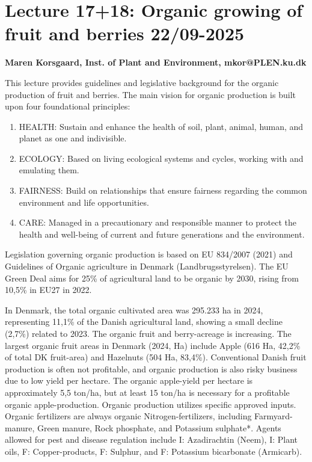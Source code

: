 \section{Lecture 17+18: Organic growing of fruit and
berries 22/09-2025}
\textbf{Maren Korsgaard, Inst. of Plant and Environment, mkor@PLEN.ku.dk}

\vspace{1em}
This lecture provides guidelines and legislative background for the organic production of fruit and berries. The main vision for organic production is built upon four foundational principles: 

\begin{enumerate} 
    \item HEALTH: Sustain and enhance the health of soil, plant, animal, human, and planet as one and indivisible. 
    \item ECOLOGY: Based on living ecological systems and cycles, working with and emulating them. 
    \item FAIRNESS: Build on relationships that ensure fairness regarding the common environment and life opportunities. 
    \item CARE: Managed in a precautionary and responsible manner to protect the health and well-being of current and future generations and the environment. 
\end{enumerate} 

\vspace{0.5em}
Legislation governing organic production is based on EU 834/2007 (2021) and Guidelines of Organic agriculture in Denmark (Landbrugsstyrelsen). The EU Green Deal aims for 25\% of agricultural land to be organic by 2030, rising from 10,5\% in EU27 in 2022.

\vspace{0.5em}
In Denmark, the total organic cultivated area was 295.233 ha in 2024, representing 11,1\% of the Danish agricultural land, showing a small decline (2,7\%) related to 2023. The organic fruit and berry-acreage is increasing. The largest organic fruit areas in Denmark (2024, Ha) include Apple (616 Ha, 42,2\% of total DK fruit-area) and Hazelnuts (504 Ha, 83,4\%). Conventional Danish fruit production is often not profitable, and organic production is also risky business due to low yield per hectare. The organic apple-yield per hectare is approximately 5,5 ton/ha, but at least 15 ton/ha is necessary for a profitable organic apple-production.
Organic production utilizes specific approved inputs. Organic fertilizers are always organic Nitrogen-fertilizers, including Farmyard-manure, Green manure, Rock phosphate, and Potassium sulphate*. Agents allowed for pest and disease regulation include I: Azadirachtin (Neem), I: Plant oils, F: Copper-products, F: Sulphur, and F: Potassium bicarbonate (Armicarb).

